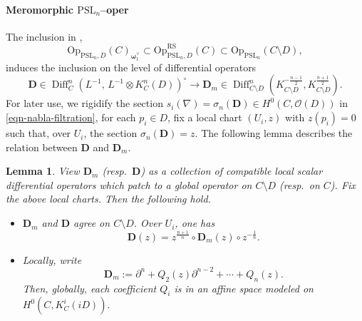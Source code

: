 \documentclass[twoside, 11pt]{article}
\numberwithin{equation}{section}
\theoremstyle{theorem}
\numberwithin{theorem}{section}
\newtheorem{lemma}[lemma]{Lemma}
\theoremstyle{definition}
\begin{document}
\paragraph{Meromorphic $\mathrm{PSL}_n$--oper}
The inclusion in ,
\[
\mathrm{Op}_{\mathrm{PSL}_n,D}(C)_{\boldsymbol{\omega}_{1}^{\vee}}
\subset
\mathrm{Op}_{\mathrm{PSL}_n,D}^{\mathrm{RS}}(C)
\subset
\mathrm{Op}_{\mathrm{PSL}_n}(C\setminus D),
\]
induces the inclusion on the level of differential operators
\begin{equation}\label{e:inclusion in diff operator}
\mathbf D \in \operatorname{Diff}_C^{n} (L^{-1},\,L^{-1}\otimes K_C^{n}(D))^\circ
 \to
 \mathbf D_m \in \operatorname{Diff}^n_{C\setminus D} (K_{C\setminus D}^{-\frac{n-1}{2}}, K_{C\setminus D}^{\frac{n+1}{2}}).
\end{equation}
For later use, we rigidify the section $s_i(\nabla)=\sigma_n(\mathbf{D}) \in H^0(C,\mathcal{O}(D))$ in \eqref{eqn-nabla-filtration}, for each $p_i\in D$, fix a local chart $(U_i,z)$ with $z(p_i)=0$ such that, over $U_i$, the section $\sigma_n(\mathbf{D})=z$.
The following lemma describes the relation between $\mathbf D$ and $\mathbf D_m$.

\begin{lemma}\label{p:trans of diff opers}
View $\mathbf D_m$ (resp.\ $\mathbf D$) as a collection of compatible local scalar differential operators which patch to a global operator on $C\setminus D$ (resp.\ on $C$). Fix the above local charts. Then the following hold.
\begin{itemize}
    \item 
$\mathbf D_m$ and $\mathbf D$ agree on $C\setminus D$.
Over $U_i$, one has
\begin{equation}\label{e:transform rule of mero oper0}
\mathbf D(z)
=
z^{\frac{n+1}{n}}\circ \mathbf D_m(z) \circ z^{-\frac{1}{n}} .
\end{equation}

\item Locally, write
\begin{equation}\label{local Dm}
\mathbf D_m
:= \partial^n + Q_2(z)\partial^{n-2} + \cdots + Q_n(z).
\end{equation}
Then, globally, each coefficient $Q_i$ is in an affine space modeled on
\(
H^0\!\left(C,K_C^i(iD)\right).
\)
\end{itemize}
\end{lemma}
\end{document}
